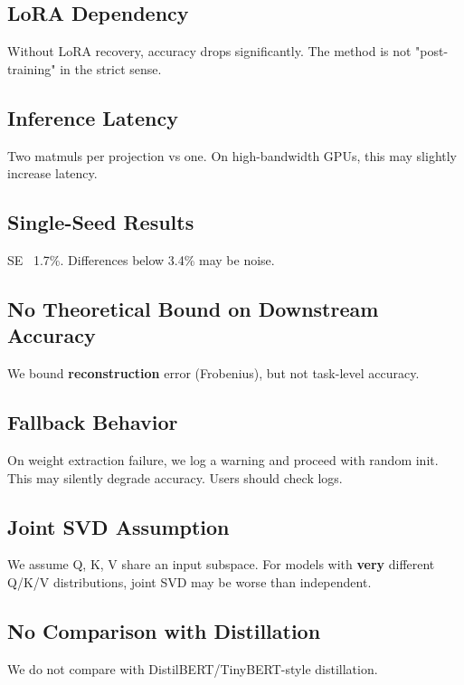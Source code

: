 \subsection{LoRA Dependency}

Without LoRA recovery, accuracy drops significantly. The method is not 
"post-training" in the strict sense.

\subsection{Inference Latency}

Two matmuls per projection vs one. On high-bandwidth GPUs, this may 
slightly increase latency.

\subsection{Single-Seed Results}

SE ~1.7\%. Differences below 3.4\% may be noise.

\subsection{No Theoretical Bound on Downstream Accuracy}

We bound \textbf{reconstruction} error (Frobenius), but not task-level accuracy.

\subsection{Fallback Behavior}

On weight extraction failure, we log a warning and proceed with random init. 
This may silently degrade accuracy. Users should check logs.

\subsection{Joint SVD Assumption}

We assume Q, K, V share an input subspace. For models with \textbf{very} different 
Q/K/V distributions, joint SVD may be worse than independent.

\subsection{No Comparison with Distillation}

We do not compare with DistilBERT/TinyBERT-style distillation.

